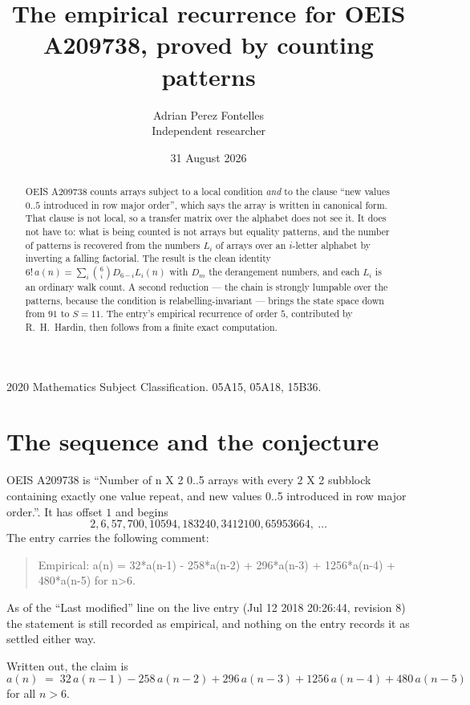 \documentclass[11pt,a4paper]{article}
\title{The empirical recurrence for OEIS A209738, proved by counting patterns}
\author{Adrian Perez Fontelles\\ \small Independent researcher}
\date{31 August 2026}
\theoremstyle{plain}
\theoremstyle{definition}
\begin{document}
\maketitle

\begin{abstract}
OEIS A209738 counts arrays subject to a local condition \emph{and} to the clause ``new values
$0..5$ introduced in row major order'', which says the array is written in canonical
form. That clause is not local, so a transfer matrix over the alphabet does not see it. It
does not have to: what is being counted is not arrays but equality patterns, and the number
of patterns is recovered from the numbers $L_i$ of arrays over an $i$-letter alphabet by
inverting a falling factorial. The result is the clean identity
$6!\,a(n)=\sum_i\binom{6}{i}D_{6-i}L_i(n)$ with $D_m$ the derangement numbers,
and each $L_i$ is an ordinary walk count. A second reduction --- the chain is strongly
lumpable over the patterns, because the condition is relabelling-invariant --- brings the
state space down from $91$ to $S=11$. The entry's empirical recurrence of order
$5$, contributed by R.~H.~Hardin, then follows from a finite exact computation.
\end{abstract}

\noindent\small 2020 Mathematics Subject Classification. 05A15, 05A18, 15B36.\normalsize

\section{The sequence and the conjecture}

OEIS A209738 is ``Number of n X 2 0..5 arrays with every 2 X 2 subblock containing exactly one value repeat, and new values 0..5 introduced in row major order.''. It has offset $1$ and begins
\[
2, 6, 57, 700, 10594, 183240, 3412100, 65953664,\ \dots
\]
The entry carries the following comment:
\begin{quote}\small
Empirical: a(n) = 32*a(n-1) - 258*a(n-2) + 296*a(n-3) + 1256*a(n-4) + 480*a(n-5) for n>6.
\end{quote}
As of the ``Last modified'' line on the live entry (Jul 12 2018 20:26:44, revision 8) the statement is
still recorded as empirical, and nothing on the entry records it as settled either way.

Written out, the claim is
\begin{equation}\label{eq:conj}
a(n)\;=\;32\,a(n-1) - 258\,a(n-2) + 296\,a(n-3) + 1256\,a(n-4) + 480\,a(n-5)
\end{equation}
for all $n>6$.
\end{document}
